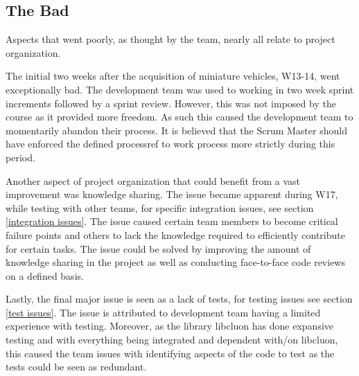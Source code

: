 \documentclass[12pt]{article}
\begin{document}
\subsection{The Bad}
Aspects that went poorly, as thought by the team, nearly all relate to project organization. \par
The initial two weeks after the acquisition of miniature vehicles, W13-14, went exceptionally bad. The development team was used to working in two week sprint increments followed by a sprint review. However, this was not imposed by the course as it provided more freedom. As such this caused the development team to momentarily abandon their process. It is believed that the Scrum Master should have enforced the defined process{ref to work process} more strictly during this period. \par  
Another aspect of project organization that could benefit from a vast improvement was knowledge sharing. The issue became apparent during W17, while testing with other teams, for specific integration issues, see section \ref{integration issues}. The issue caused certain team members to become critical failure points and others to lack the knowledge required to efficiently contribute for certain tasks. The issue could be solved by improving the amount of knowledge sharing in the project as well as conducting face-to-face code reviews on a defined basis. \par
Lastly, the final major issue is seen as a lack of tests, for testing issues see section \ref{test issues}. The issue is attributed to development team having a limited experience with testing. Moreover, as the library libcluon has done expansive testing and with everything being integrated and dependent with/on libcluon, this caused the team issues  with identifying aspects of the code to test as the tests could be seen as redundant.  
\end{document}
